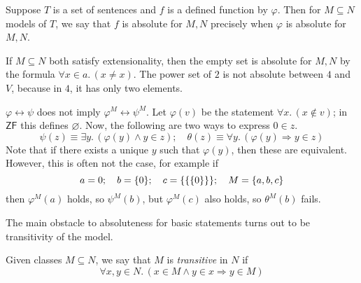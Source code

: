 Suppose \( T \) is a set of sentences and \( f \) is a defined function by \( \varphi \).
Then for \( M \subseteq N \) models of \( T \), we say that \( f \) is absolute for \( M, N \) precisely when \( \varphi \) is absolute for \( M, N \).
\begin{example}
    If \( M \subseteq N \) both satisfy extensionality, then the empty set is absolute for \( M, N \) by the formula \( \forall x \in a.\, (x \neq x) \).
    The power set of \( 2 \) is not absolute between \( 4 \) and \( V \), because in \( 4 \), it has only two elements.
\end{example}
\begin{example}
    \( \varphi \leftrightarrow \psi \) does not imply \( \varphi^M \leftrightarrow \psi^M \).
    Let \( \varphi(v) \) be the statement \( \forall x.\, (x \notin v) \); in \( \mathsf{ZF} \) this defines \( \varnothing \).
    Now, the following are two ways to express \( 0 \in z \).
    \[ \psi(z) \equiv \exists y.\, (\varphi(y) \wedge y \in z);\quad \theta(z) \equiv \forall y.\, (\varphi(y) \Rightarrow y \in z) \]
    Note that if there exists a unique \( y \) such that \( \varphi(y) \), then these are equivalent.
    However, this is often not the case, for example if
    \[ a = 0;\quad b = \qty{0};\quad c = \qty{\qty{\qty{0}}};\quad M = \qty{a, b, c} \]
    then \( \varphi^M(a) \) holds, so \( \psi^M(b) \), but \( \varphi^M(c) \) also holds, so \( \theta^M(b) \) fails.
\end{example}
The main obstacle to absoluteness for basic statements turns out to be transitivity of the model.
\begin{definition}
    Given classes \( M \subseteq N \), we say that \( M \) is \emph{transitive} in \( N \) if
    \[ \forall x, y \in N.\, (x \in M \wedge y \in x \Rightarrow y \in M) \]
\end{definition}

